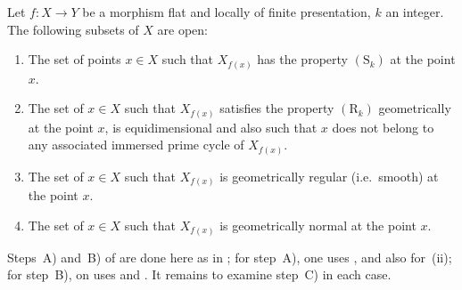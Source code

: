 \begin{theorem}[12.1.6]
\label{IV.12.1.6}
Let $f:X\to Y$ be a morphism flat and locally of finite presentation, $k$ an integer.
The following subsets of $X$ are open:
\begin{enumerate}[label=(\roman*)]
  \item The set of points $x\in X$ such that $X_{f(x)}$ has the property $(\mathrm{S}_k)$ at the point $x$.
  \item The set of $x\in X$ such that $X_{f(x)}$ satisfies the property $(\mathrm{R}_k)$ geometrically at the point $x$, is equidimensional and also such that $x$ does not belong to any associated immersed prime cycle of $X_{f(x)}$.
  \item The set of $x\in X$ such that $X_{f(x)}$ is geometrically regular (i.e.\ smooth) at the point $x$.
  \item The set of $x\in X$ such that $X_{f(x)}$ is geometrically normal at the point $x$.
\end{enumerate}

Steps~A) and~B) of  are done here as in ; for step~A), one uses , and also  for~(ii); for step~B), on uses  and .
It remains to examine step~C) in each case.
\end{theorem}

